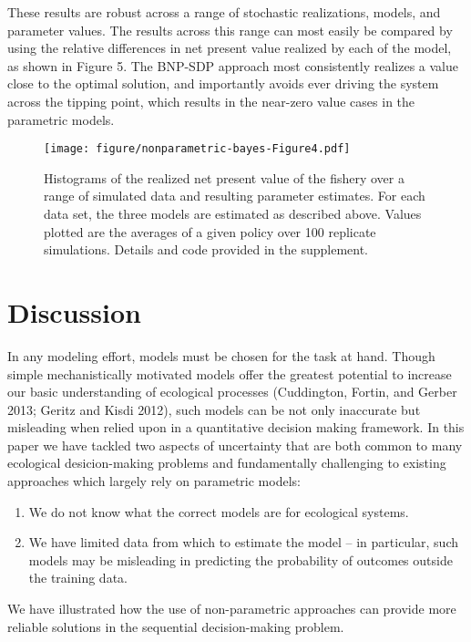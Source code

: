 \documentclass[author-year, review]{elsarticle} %
\makeatletter
\def\maxwidth{\ifdim\Gin@nat@width>\linewidth\linewidth
\else\Gin@nat@width\fi}
\let\Oldincludegraphics\includegraphics
\renewcommand{\includegraphics}[1]{\Oldincludegraphics[width=\maxwidth]{#1}}
\makeatother
\begin{document}
These results are robust across a range of stochastic realizations,
models, and parameter values. The results across this range can most
easily be compared by using the relative differences in net present
value realized by each of the model, as shown in Figure 5. The BNP-SDP
approach most consistently realizes a value close to the optimal
solution, and importantly avoids ever driving the system across the
tipping point, which results in the near-zero value cases in the
parametric models.

\begin{figure}[htbp]
\centering
\texttt{[image: figure/nonparametric-bayes-Figure4.pdf]}
\caption{Histograms of the realized net present value of the fishery
over a range of simulated data and resulting parameter estimates. For
each data set, the three models are estimated as described above. Values
plotted are the averages of a given policy over 100 replicate
simulations. Details and code provided in the supplement.}
\end{figure}

\section{Discussion}\label{discussion}

In any modeling effort, models must be chosen for the task at hand.
Though simple mechanistically motivated models offer the greatest
potential to increase our basic understanding of ecological processes
(Cuddington, Fortin, and Gerber 2013; Geritz and Kisdi 2012), such
models can be not only inaccurate but misleading when relied upon in a
quantitative decision making framework. In this paper we have tackled
two aspects of uncertainty that are both common to many ecological
desicion-making problems and fundamentally challenging to existing
approaches which largely rely on parametric models:

\begin{enumerate}
\def\labelenumi{\arabic{enumi}.}
\itemsep1pt\parskip0pt
\item
  We do not know what the correct models are for ecological systems.
\item
  We have limited data from which to estimate the model -- in
  particular, such models may be misleading in predicting the
  probability of outcomes outside the training data.
\end{enumerate}

We have illustrated how the use of non-parametric approaches can provide
more reliable solutions in the sequential decision-making problem.
\end{document}

